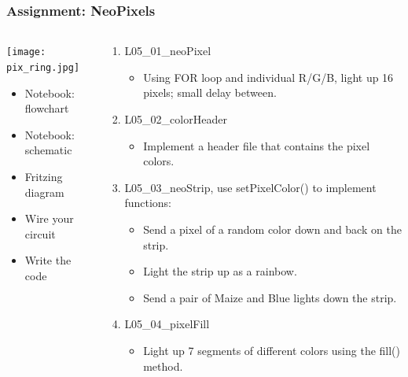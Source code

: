 \documentclass{beamer}
\begin{document}
\begin{frame}\frametitle{Assignment: NeoPixels}
\begin{columns}
\begin{column}{4.2cm}
\begin{center}
\texttt{[image: pix\_ring.jpg]}
\end{center}
\begin{itemize}
\item Notebook: flowchart
\item Notebook: schematic
\item Fritzing diagram
\item Wire your circuit
\item Write the code
\end{itemize}
\end{column}
\begin{column}{7.4cm}
\begin{enumerate}
\item L05\_01\_neoPixel
	\begin{itemize}
		\item Using FOR loop and individual R/G/B, light up 16 pixels; small delay between.
	\end{itemize}
\item L05\_02\_colorHeader
	\begin{itemize}
		\item Implement a header file that contains the pixel colors.
	\end{itemize}
\item L05\_03\_neoStrip, use setPixelColor() to implement functions:
	\begin{itemize}
		\item Send a pixel of a random color down and back on the strip.
		\item Light the strip up as a rainbow.
		\item Send a pair of Maize and Blue lights down the strip.
	\end{itemize}
\item L05\_04\_pixelFill
	\begin{itemize}
		\item Light up 7 segments of different colors using the fill() method.
	\end{itemize}	
\end{enumerate}
\end{column}
\end{columns}
\end{frame}
\end{document}
